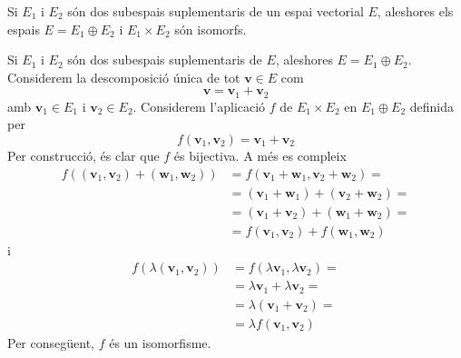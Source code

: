 \begin{teorema}
Si $E_{1}$ i $E_{2}$ són dos subespais suplementaris de
un espai vectorial $E$, aleshores els espais $E=E%
_{1}\oplus E_{2}$ i $E_{1}\times E_{2}$ són
isomorfs.

\end{teorema}
\begin{prova}
Si $E_{1}$ i $E_{2}$ són dos subespais suplementaris de 
$E$, aleshores $E=E_{1}\oplus E_{2}$.
Considerem la descomposició única de tot $\mathbf{v}\in E$ com%
\begin{equation*}
\mathbf{v}=\mathbf{v}_{1}+\mathbf{v}_{2}
\end{equation*}%
amb $\mathbf{v}_{1}\in E_{1}$ i $\mathbf{v}_{2}\in E_{2}$.
Considerem l’aplicació $f$ de $E_{1}\times E_{2}$
en $E_{1}\oplus E_{2}$ definida per%
\begin{equation*}
f(\mathbf{v}_{1},\mathbf{v}_{2})=\mathbf{v}_{1}+\mathbf{v}_{2}
\end{equation*}%
Per construcció, és clar que $f$ és bijectiva. A més es compleix%
\begin{align*}
f\left( (\mathbf{v}_{1},\mathbf{v}_{2})+(\mathbf{w}_{1},\mathbf{w}%
_{2})\right) &=f(\mathbf{v}_{1}+\mathbf{w}_{1},\mathbf{v}_{2}+\mathbf{w}%
_{2})= \\
&=\left( \mathbf{v}_{1}+\mathbf{w}_{1}\right) +(\mathbf{v}_{2}+\mathbf{w}%
_{2})= \\
&=(\mathbf{v}_{1}+\mathbf{v}_{2})+(\mathbf{w}_{1}+\mathbf{w}_{2})= \\
&=f(\mathbf{v}_{1},\mathbf{v}_{2})+f(\mathbf{w}_{1},\mathbf{w}_{2})
\end{align*}%
i%
\begin{align*}
f(\lambda (\mathbf{v}_{1},\mathbf{v}_{2})) &=f(\lambda \mathbf{v}%
_{1},\lambda \mathbf{v}_{2})= \\
&=\lambda \mathbf{v}_{1}+\lambda \mathbf{v}_{2}= \\
&=\lambda (\mathbf{v}_{1}+\mathbf{v}_{2})= \\
&=\lambda f(\mathbf{v}_{1},\mathbf{v}_{2})
\end{align*}%
Per consegüent, $f$ és un isomorfisme.
\end{prova}

